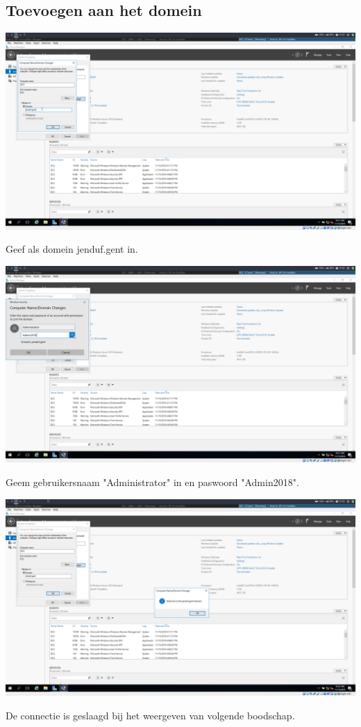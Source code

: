 \documentclass[a4paper]{article}
\begin{document}
\subsection{Toevoegen aan het domein}
\begin{center}
	\includegraphics[width=15cm]{Pictures/DC2/Basisconfiguratie/1542306751.png}
	
	Geef als domein jenduf.gent in.
\end{center}
\begin{center}
	\includegraphics[width=15cm]{Pictures/DC2/Basisconfiguratie/1542306762.png}
	
	Geem gebruikersnaam "Administrator" in en paswoord "Admin2018".
\end{center}
\begin{center}
	\includegraphics[width=15cm]{Pictures/DC2/Basisconfiguratie/1542306780.png}
	
	De connectie is geslaagd bij het weergeven van volgende boodschap.
	
\end{center}
\end{document}
